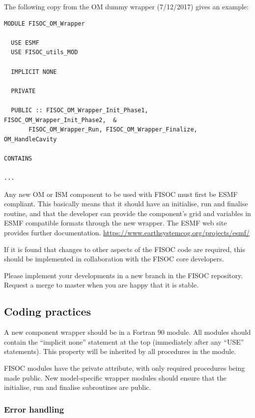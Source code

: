 \documentclass[12pt]{article}
\begin{document}
The following copy from the OM dummy wrapper (7/12/2017) gives 
an example:

\begin{lstlisting}
MODULE FISOC_OM_Wrapper

  USE ESMF
  USE FISOC_utils_MOD

  IMPLICIT NONE

  PRIVATE

  PUBLIC :: FISOC_OM_Wrapper_Init_Phase1,  FISOC_OM_Wrapper_Init_Phase2,  &
       FISOC_OM_Wrapper_Run, FISOC_OM_Wrapper_Finalize, OM_HandleCavity

CONTAINS

...
\end{lstlisting}


Any new OM or ISM component to be used with FISOC must first be ESMF compliant.  This basically 
means that it should have an initialise, run and finalise routine, and that the developer can 
provide the component's grid and variables in ESMF compatible formats through the new wrapper.
The ESMF web site provides further documentation.
\url{https://www.earthsystemcog.org/projects/esmf/}

If it is found that changes to other aspects of the FISOC code are required, this should be 
implemented in collaboration with the FISOC core developers.

Please implement your developments in a new branch in the FISOC repository. 
Request a merge to master when you are happy that it is stable. 




\subsection{Coding practices}

A new component wrapper  should be in a Fortran 90 module.  
All modules should contain the ``implicit none'' statement at the top (immediately after any 
``USE'' statements).  This property will be inherited by all procedures in the module.

FISOC modules have the private attribute, with only required procedures being 
made public. 
New model-specific wrapper modules should ensure that the initialise, run and finalise 
subroutines are public. 



\subsubsection{Error handling}
\end{document}
